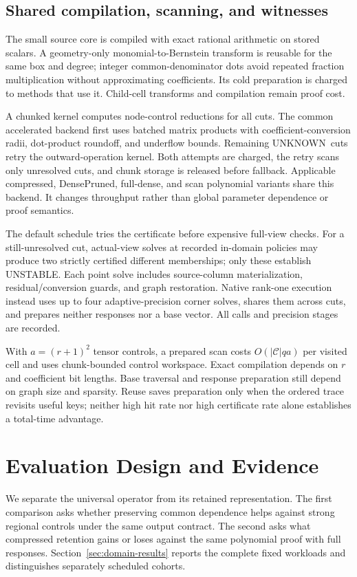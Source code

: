 \documentclass[conference]{IEEEtran}
\newcommand{\unstable}{\textsf{UNSTABLE}}
\newcommand{\unknown}{\textsf{UNKNOWN}}
\begin{document}
\subsection{Shared compilation, scanning, and witnesses}
The small source core is compiled with exact rational arithmetic on stored scalars. A geometry-only monomial-to-Bernstein transform is reusable for the same box and degree; integer common-denominator dots avoid repeated fraction multiplication without approximating coefficients. Its cold preparation is charged to methods that use it. Child-cell transforms and compilation remain proof cost.

A chunked kernel computes node-control reductions for all cuts. The common accelerated backend first uses batched matrix products with coefficient-conversion radii, dot-product roundoff, and underflow bounds. Remaining \unknown\ cuts retry the outward-operation kernel. Both attempts are charged, the retry scans only unresolved cuts, and chunk storage is released before fallback. Applicable compressed, DensePruned, full-dense, and scan polynomial variants share this backend. It changes throughput rather than global parameter dependence or proof semantics.

The default schedule tries the certificate before expensive full-view checks. For a still-unresolved cut, actual-view solves at recorded in-domain policies may produce two strictly certified different memberships; only these establish \unstable. Each point solve includes source-column materialization, residual/conversion guards, and graph restoration. Native rank-one execution instead uses up to four adaptive-precision corner solves, shares them across cuts, and prepares neither responses nor a base vector. All calls and precision stages are recorded.

With $a=(r+1)^2$ tensor controls, a prepared scan costs $O(|\mathcal C|qa)$ per visited cell and uses chunk-bounded control workspace. Exact compilation depends on $r$ and coefficient bit lengths. Base traversal and response preparation still depend on graph size and sparsity. Reuse saves preparation only when the ordered trace revisits useful keys; neither high hit rate nor high certificate rate alone establishes a total-time advantage.

\section{Evaluation Design and Evidence}
\label{sec:evaluation}
We separate the universal operator from its retained representation. The first comparison asks whether preserving common dependence helps against strong regional controls under the same output contract. The second asks what compressed retention gains or loses against the same polynomial proof with full responses. Section~\ref{sec:domain-results} reports the complete fixed workloads and distinguishes separately scheduled cohorts.
\end{document}
